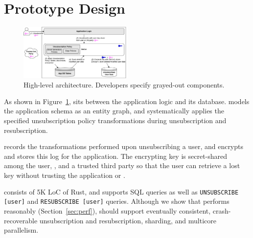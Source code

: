 \section{Prototype Design}
\label{sec:proto}

\begin{figure}[t!]
    \centering
    \includegraphics[width=0.5\textwidth]{img/releaser_arch}

    \caption{High-level \sys architecture. Developers specify grayed-out components.}
    \label{fig:arch}
\end{figure}

As shown in Figure~\ref{fig:arch}, \sys sits between the application logic and its database. \sys
models the application schema as an entity graph, and systematically applies the specified
unsubscription policy transformations during unsubscription and resubscription.

\sys records the transformations performed upon unsubscribing a user, and encrypts and stores this
log for the application. The encrypting key is secret-shared~\cite{secretsharing} among the user,
\sys, and a trusted third party so that the user can retrieve a lost key without trusting the
application or \sys.

\sys consists of 5K LoC of Rust, and supports SQL queries as well as \texttt{UNSUBSCRIBE
[user]} and \texttt{RESUBSCRIBE [user]} queries.
Although we show that \sys performs reasonably (Section~\ref{sec:perf}), \sys should support eventually
consistent, crash-recoverable unsubscription and resubscription, sharding, and multicore parallelism.




